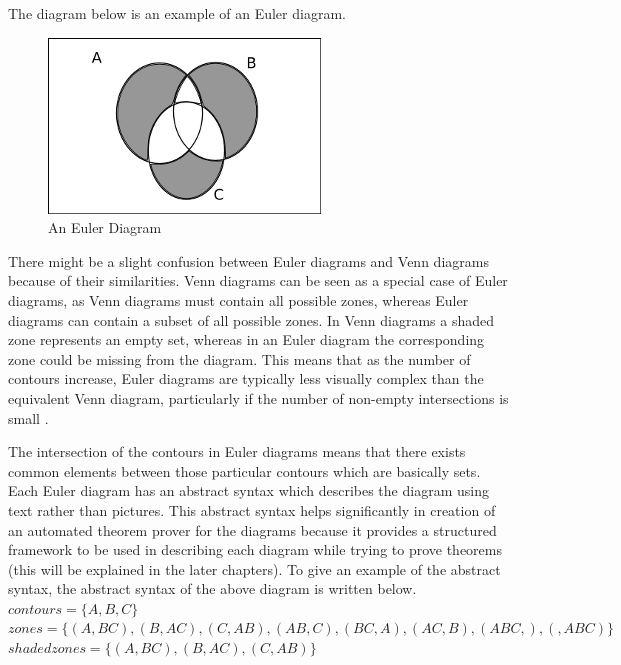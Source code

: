 \documentclass[a4paper]{article}
\begin{document}
The diagram below is an example of an Euler diagram.

\begin{figure}[h]
\centering
\includegraphics{images/dia2.png}
\caption{An Euler Diagram}
\end{figure}

There might be a slight confusion between Euler diagrams and Venn diagrams because of their similarities. Venn diagrams can be seen as a special case of Euler diagrams, as Venn diagrams must contain all possible zones, whereas Euler diagrams can contain a subset of all possible zones. In Venn diagrams a shaded zone represents an empty set, whereas in an Euler diagram the corresponding zone could be missing from the diagram. This means that as the number of contours increase, Euler diagrams are typically less visually complex than the equivalent Venn diagram, particularly if the number of non-empty intersections is small \cite{Kent_Euler}.

The intersection of the contours in Euler diagrams means that there exists common elements between those particular contours which are basically sets. Each Euler diagram has an abstract syntax which describes the diagram using text rather than pictures. This abstract syntax helps significantly in creation of an automated theorem prover for the diagrams because it provides a structured framework to be used in describing each diagram while trying to prove theorems (this will be explained in the later chapters). To give an example of the abstract syntax, the abstract syntax of the above diagram is written below.
\newline \newline
$contours =  \lbrace A, B, C \rbrace $ \newline
$zones = \lbrace (A , BC) , (B , AC), (C, AB), (AB , C) , (BC , A) , (AC, B), (ABC , ), (  , ABC) \rbrace  $ \newline 
$shaded zones = \lbrace (A , BC), (B , AC) , (C, AB) \rbrace  $ \newline
\end{document}
